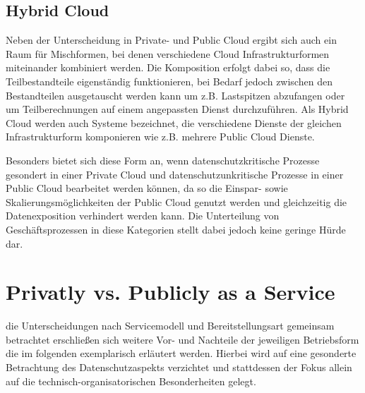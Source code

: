 \subsection{Hybrid Cloud}
Neben der Unterscheidung in Private- und Public Cloud ergibt sich auch ein Raum für Mischformen, bei denen verschiedene Cloud Infrastrukturformen miteinander kombiniert werden. Die Komposition erfolgt dabei so, dass die Teilbestandteile eigenständig funktionieren, bei Bedarf jedoch zwischen den Bestandteilen ausgetauscht werden kann um z.B. Lastspitzen abzufangen oder um Teilberechnungen auf einem angepassten Dienst durchzuführen. Als Hybrid Cloud werden auch Systeme bezeichnet, die verschiedene Dienste der gleichen Infrastrukturform komponieren wie z.B. mehrere Public Cloud Dienste.

Besonders bietet sich diese Form an, wenn datenschutzkritische Prozesse gesondert in einer Private Cloud und datenschutzunkritische Prozesse in einer Public Cloud bearbeitet werden können, da so die Einspar- sowie Skalierungsmöglichkeiten der Public Cloud genutzt werden und gleichzeitig die Datenexposition verhindert werden kann. Die Unterteilung von Geschäftsprozessen in diese Kategorien stellt dabei jedoch keine geringe Hürde dar.

\section{Privatly vs. Publicly as a Service}
\label{sec_privacy_service_models}

 die Unterscheidungen nach Servicemodell und Bereitstellungsart gemeinsam betrachtet erschließen sich weitere Vor- und Nachteile der jeweiligen Betriebsform die im folgenden exemplarisch erläutert werden. Hierbei wird auf eine gesonderte Betrachtung des Datenschutzaspekts verzichtet und stattdessen der Fokus allein auf die technisch-organisatorischen Besonderheiten gelegt. 

